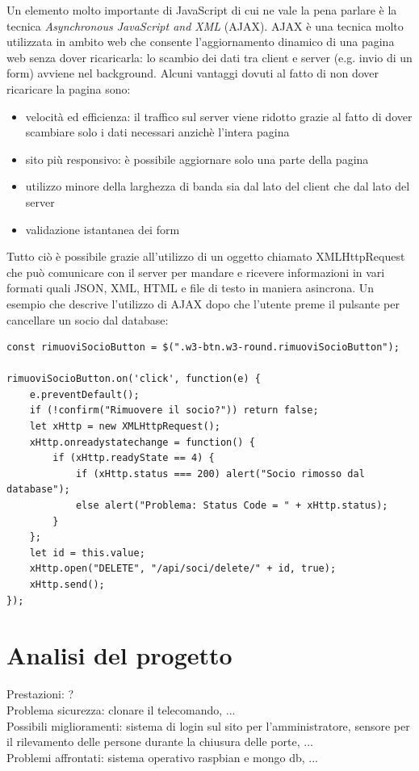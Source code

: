 \documentclass[12pt]{report}
\begin{document}
Un elemento molto importante di JavaScript di cui ne vale la pena parlare è la tecnica \emph{Asynchronous JavaScript and XML} (AJAX). AJAX è una tecnica molto utilizzata in ambito web che consente l'aggiornamento dinamico di una pagina web senza dover ricaricarla: lo scambio dei dati tra client e server (e.g. invio di un form) avviene nel background. Alcuni vantaggi dovuti al fatto di non dover ricaricare la pagina sono: 
\begin{itemize}
	\item velocità ed efficienza: il traffico sul server viene ridotto grazie al fatto di dover scambiare solo i dati necessari anzichè l'intera pagina
	\item sito più responsivo: è possibile aggiornare solo una parte della pagina
	\item utilizzo minore della larghezza di banda sia dal lato del client che dal lato del server
	\item validazione istantanea dei form
\end{itemize}
Tutto ciò è possibile grazie all'utilizzo di un oggetto chiamato XMLHttpRequest che può comunicare con il server per mandare e ricevere informazioni in vari formati quali JSON, XML, HTML e file di testo in maniera asincrona. Un esempio che descrive l'utilizzo di AJAX dopo che l'utente preme il pulsante per cancellare un socio dal database:
\begin{lstlisting}
const rimuoviSocioButton = $(".w3-btn.w3-round.rimuoviSocioButton");

rimuoviSocioButton.on('click', function(e) {
	e.preventDefault();
	if (!confirm("Rimuovere il socio?")) return false;
	let xHttp = new XMLHttpRequest();
	xHttp.onreadystatechange = function() {
		if (xHttp.readyState == 4) {
			if (xHttp.status === 200) alert("Socio rimosso dal database");
			else alert("Problema: Status Code = " + xHttp.status);
		}
	};
	let id = this.value;
	xHttp.open("DELETE", "/api/soci/delete/" + id, true);
	xHttp.send();
});
\end{lstlisting}


%
% 
\chapter{Analisi del progetto}
\label{cap4}
Prestazioni: ?
\\
Problema sicurezza: clonare il telecomando, ...
\\
Possibili miglioramenti: sistema di login sul sito per l'amministratore,
sensore per il rilevamento delle persone durante la chiusura delle porte,
...
\\
Problemi affrontati: sistema operativo raspbian e mongo db, ...
\end{document}
